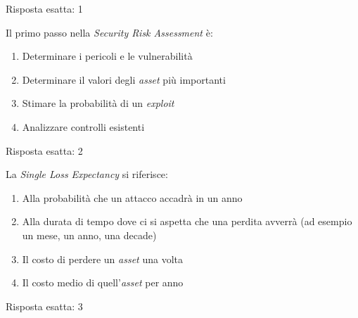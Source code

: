 \begin{Answer} [
  ref={gestRisk2},
  number={2}
  ]

  \Question Risposta esatta: 1

\end{Answer}



\begin{Exercise} [
  title={Quiz},
  label={gestRisk3}
  ]

  \Question Il primo passo nella \textit{Security Risk Assessment} \`e:
\begin{enumerate}
 \item Determinare i pericoli e le vulnerabilit\`a
 \item Determinare il valori degli \textit{asset} pi\`u importanti
 \item Stimare la probabilit\`a di un \textit{exploit}
 \item Analizzare controlli esistenti
\end{enumerate}

\end{Exercise}


\begin{Answer} [
  ref={gestRisk3},
  number={3}
  ]

  \Question Risposta esatta: 2

\end{Answer}



\begin{Exercise} [
  title={Quiz},
  label={gestRisk4}
  ]

  \Question La \textit{Single Loss Expectancy} si riferisce:
\begin{enumerate}
 \item Alla probabilit\`a che un attacco accadr\`a in un anno
 \item Alla durata di tempo dove ci si aspetta che una perdita avverr\`a (ad
esempio un mese, un anno, una decade)
 \item Il costo di perdere un \textit{asset} una volta
 \item Il costo medio di quell'\textit{asset} per anno
\end{enumerate}

\end{Exercise}


\begin{Answer} [
  ref={gestRisk4},
  number={4}
  ]

  \Question Risposta esatta: 3

\end{Answer}



